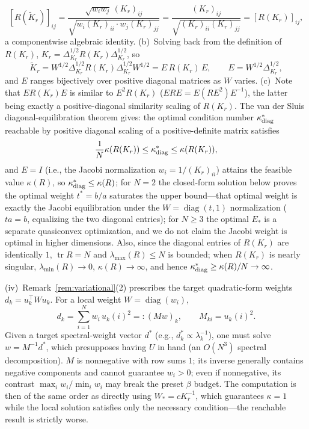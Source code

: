 \documentclass[11pt]{article}
\newcommand{\W}{W}
\DeclareMathOperator{\diag}{diag}
\DeclareMathOperator{\tr}{tr}
\numberwithin{equation}{section}
\begin{document}
\[
[R(\widetilde K_r)]_{ij}=\frac{\sqrt{w_iw_j}\,(K_r)_{ij}}{\sqrt{w_i(K_r)_{ii}\cdot w_j(K_r)_{jj}}}
=\frac{(K_r)_{ij}}{\sqrt{(K_r)_{ii}(K_r)_{jj}}}=[R(K_r)]_{ij},
\]
a componentwise algebraic identity. (b)~Solving back from the definition of $R(K_r)$, $K_r=\Delta_{K_r}^{1/2}R(K_r)\Delta_{K_r}^{1/2}$, so
\[
\widetilde K_r=\W^{1/2}\Delta_{K_r}^{1/2}R(K_r)\Delta_{K_r}^{1/2}\W^{1/2}=E\,R(K_r)\,E,\qquad
E=\W^{1/2}\Delta_{K_r}^{1/2},
\]
and $E$ ranges bijectively over positive diagonal matrices as $\W$ varies. (c)~Note that $E R(K_r) E$ is similar to $E^2R(K_r)$ ($E R E=E(R E^2)E^{-1}$), the latter being exactly a positive-diagonal similarity scaling of $R(K_r)$. The van der Sluis diagonal-equilibration theorem \cite{vanderSluis1969} gives: the optimal condition number $\kappa^*_{\rm diag}$ reachable by positive diagonal scaling of a positive-definite matrix satisfies
\[
\frac1N\kappa(R(K_r))\le\kappa^*_{\rm diag}\le\kappa(R(K_r)),
\]
and $E=I$ (i.e., the Jacobi normalization $w_i=1/(K_r)_{ii}$) attains the feasible value $\kappa(R)$, so $\kappa^*_{\rm diag}\le\kappa(R)$; for $N=2$ the closed-form solution below proves the optimal weight $t^*=b/a$ saturates the upper bound---that optimal weight is exactly the Jacobi equilibration under the $\W=\diag(t,1)$ normalization ($ta=b$, equalizing the two diagonal entries); for $N\ge3$ the optimal $E_*$ is a separate quasiconvex optimization, and we do not claim the Jacobi weight is optimal in higher dimensions. Also, since the diagonal entries of $R(K_r)$ are identically $1$, $\tr R=N$ and $\lambda_{\max}(R)\le N$ is bounded; when $R(K_r)$ is nearly singular, $\lambda_{\min}(R)\to0$, $\kappa(R)\to\infty$, and hence $\kappa^*_{\rm diag}\ge\kappa(R)/N\to\infty$.
\par\noindent(iv)~Remark~\ref{rem:variational}(2) prescribes the target quadratic-form weights $d_k=u_k^\top\W u_k$. For a local weight $\W=\diag(w_i)$,
\[
d_k=\sum_{i=1}^N w_i\,u_k(i)^2=:(Mw)_k,\qquad M_{ki}=u_k(i)^2.
\]
Given a target spectral-weight vector $d^*$ (e.g., $d^*_k\propto\lambda_k^{-1}$), one must solve $w=M^{-1}d^*$, which presupposes having $U$ in hand (an $O(N^3)$ spectral decomposition). $M$ is nonnegative with row sums $1$; its inverse generally contains negative components and cannot guarantee $w_i>0$; even if nonnegative, its contrast $\max_iw_i/\min_iw_i$ may break the preset $\beta$ budget. The computation is then of the same order as directly using $\W_*=cK_r^{-1}$, which guarantees $\kappa=1$ while the local solution satisfies only the necessary condition---the reachable result is strictly worse.
\end{document}
